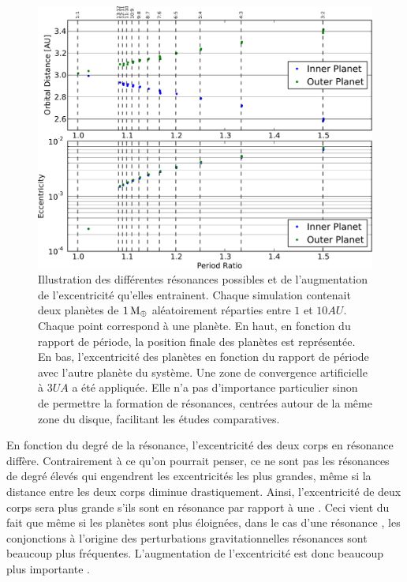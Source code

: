 \begin{figure}[htbp]
\centering
\includegraphics[width=0.75\linewidth]{figure/MMR_statistique.pdf}
\caption{Illustration des différentes résonances possibles et de l'augmentation de l'excentricité qu'elles entrainent. Chaque
simulation contenait deux planètes de $1\mathrm{\thinspace M_\oplus}$ aléatoirement réparties entre $1$ et $10\unit{AU}$. Chaque point correspond à
une planète. En haut, en fonction du rapport de période, la position finale des planètes est
représentée. En bas, l'excentricité des planètes en fonction du rapport de période avec l'autre planète du système. Une zone de
convergence artificielle à $3\unit{UA}$ a été appliquée. Elle n'a pas d'importance particulier sinon de permettre la formation
de résonances, centrées autour de la même zone du disque, facilitant les études comparatives.}\label{fig:MMR_statistique}
\end{figure}

En fonction du degré de la résonance, l'excentricité des deux corps en résonance diffère. Contrairement à ce qu'on pourrait
penser, ce ne sont pas les résonances de degré élevés qui engendrent les excentricités les plus grandes, même si la distance
entre les deux corps diminue drastiquement. Ainsi, l'excentricité de deux corps sera plus grande s'ils sont en résonance
 par rapport à une . Ceci vient du fait que même si les planètes sont plus éloignées, dans le cas d'une
résonance , les conjonctions à l'origine des perturbations gravitationnelles résonances sont beaucoup plus
fréquentes. L'augmentation de l'excentricité est donc beaucoup plus importante \citep{murray2000solar}. 

